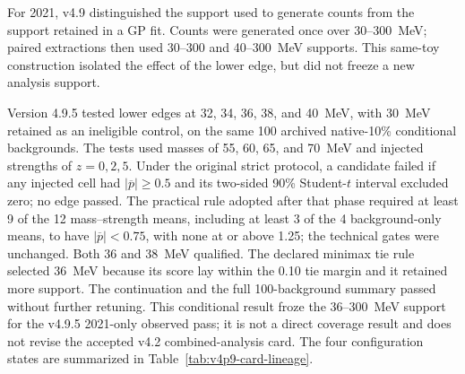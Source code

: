 For 2021, v4.9 distinguished the support used to generate counts from the support
retained in a GP fit. Counts were generated once over 30--300~MeV; paired extractions
then used 30--300 and 40--300~MeV supports. This same-toy construction isolated the
effect of the lower edge, but did not freeze a new analysis support.

Version 4.9.5 tested lower edges at 32, 34, 36, 38, and 40~MeV, with 30~MeV retained
as an ineligible control, on the same 100 archived native-10\% conditional backgrounds.
The tests used masses of 55, 60, 65, and 70~MeV and injected strengths of
$z=0,2,5$. Under the original strict protocol, a candidate failed if any injected cell
had $|\overline{p}|\geq0.5$ and its two-sided 90\% Student-$t$ interval excluded zero;
no edge passed. The practical rule adopted after that phase required at least 9 of the
12 mass--strength means, including at least 3 of the 4 background-only means, to have
$|\overline{p}|<0.75$, with none at or above 1.25; the technical gates were unchanged.
Both 36 and 38~MeV qualified. The declared minimax tie rule selected 36~MeV because
its score lay within the 0.10 tie margin and it retained more support. The continuation
and the full 100-background summary passed without further retuning. This conditional
result froze the 36--300~MeV support for the v4.9.5 2021-only observed pass; it is not
a direct coverage result and does not revise the accepted v4.2 combined-analysis card.
The four configuration states are summarized in
Table~\ref{tab:v4p9-card-lineage}.

